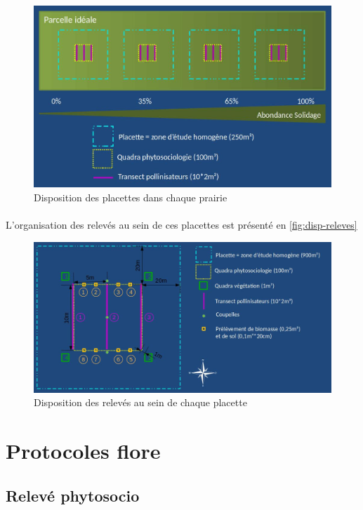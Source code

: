 \documentclass{article}
\begin{document}
	\begin{figure}[h]
		\includegraphics[width=\linewidth]{disp-placettes.jpg}
		\caption{Disposition des placettes dans chaque prairie}
		\label{fig:disp-placettes}
	\end{figure}

	\paragraph{} L'organisation des relevés au sein de ces placettes est présenté en \autoref{fig:disp-releves}

	\begin{figure}[h]
		\includegraphics[width=\linewidth]{disp-releves.jpg}
		\caption{Disposition des relevés au sein de chaque placette}
		\label{fig:disp-releves}
	\end{figure}

	\pagebreak
	\section{Protocoles flore}
	
	\subsection{Relevé phytosocio}
\end{document}
